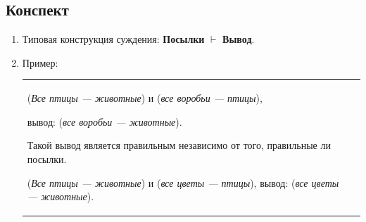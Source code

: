 \subsection*{Конспект}
\begin{enumerate}\setlength{\itemsep}{1pt}
\item Типовая конструкция суждения: \textbf{Посылки} $\vdash$ \textbf{Вывод}.
\item Пример:

\begin{tabular}{lr}
\begin{minipage}[b]{0.6\linewidth}
(\textit{Все птицы --- животные}) и (\textit{все воробьи --- птицы}),

вывод: (\textit{все воробьи --- животные}).

Такой вывод является правильным независимо от того, правильные ли посылки.

(\textit{Все птицы --- животные}) и (\textit{все цветы --- птицы}), вывод: (\textit{все цветы --- животные}).


\end{minipage}
\end{tabular}
\end{enumerate}
